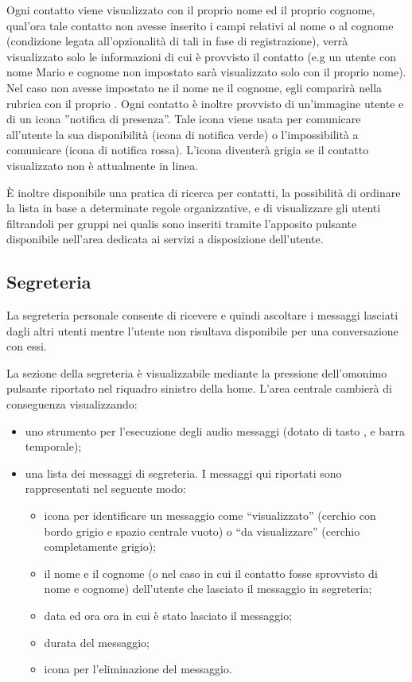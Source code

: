 Ogni contatto viene visualizzato con il proprio nome ed il proprio cognome, qual'ora tale contatto non avesse inserito i campi relativi al nome o al cognome (condizione legata all'opzionalità di tali in fase di registrazione), verrà visualizzato solo le informazioni di cui è provvisto il contatto (e.g un utente con nome Mario e cognome non impostato sarà visualizzato solo con il proprio nome). 
Nel caso non avesse impostato ne il nome ne il cognome, egli comparirà nella rubrica con il proprio . 
Ogni contatto è inoltre provvisto di un'immagine utente e di un icona ''notifica di presenza''. Tale icona viene usata per comunicare all'utente la sua disponibilità (icona di notifica verde) o l'impossibilità a comunicare (icona di notifica rossa). L'icona diventerà grigia se il contatto visualizzato non è attualmente in linea.

È inoltre disponibile una pratica  di ricerca per contatti, la possibilità di ordinare la lista in base a determinate regole organizzative, e di visualizzare gli utenti filtrandoli per gruppi nei qualis sono inseriti tramite l'apposito pulsante disponibile nell'area dedicata ai servizi a disposizione dell'utente.

\clearpage
\subsection{Segreteria}
La segreteria personale consente di ricevere e quindi ascoltare i messaggi lasciati dagli altri utenti mentre l'utente non risultava disponibile per una conversazione con essi.

La sezione della segreteria è visualizzabile mediante la pressione dell'omonimo pulsante riportato nel riquadro sinistro della home. L'area centrale cambierà di conseguenza visualizzando:
	\begin{itemize}
		\item uno strumento per l'esecuzione degli audio messaggi (dotato di tasto ,  e barra temporale);
		\item una lista dei messaggi di segreteria. I messaggi qui riportati sono rappresentati nel seguente modo:
			\begin{itemize}
				\item icona per identificare un messaggio come ``visualizzato'' (cerchio con bordo grigio e spazio centrale vuoto) o ``da visualizzare'' (cerchio completamente grigio);
				\item il nome e il cognome (o  nel caso in cui il contatto fosse sprovvisto di nome e cognome) dell'utente che lasciato il messaggio in segreteria;
				\item data ed ora ora in cui è stato lasciato il messaggio;
				\item durata del messaggio;
				\item icona per l'eliminazione del messaggio.
			\end{itemize}
	\end{itemize}	 

